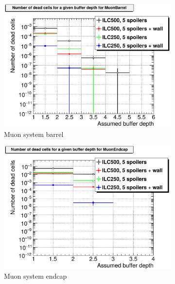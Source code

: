 \begin{figure}[htb]
\begin{subfigure}[b]{0.49\textwidth}
   \centering
    \includegraphics[width=\textwidth]{Figures/BDS_muons/Occupancy_Comparison_All_layers_deadcells_MuonBarrel.png}
   \caption{\sid Muon system barrel}
   \end{subfigure}
   \hfill
    \begin{subfigure}[b]{0.49\textwidth}
   \centering
    \includegraphics[width=\textwidth]{Figures/BDS_muons/Occupancy_Comparison_All_layers_deadcells_MuonEndcap.png}
   \caption{\sid Muon system endcap}
   \end{subfigure}\\
     \begin{subfigure}[b]{0.49\textwidth}
   \centering

\end{subfigure}
\end{figure}
